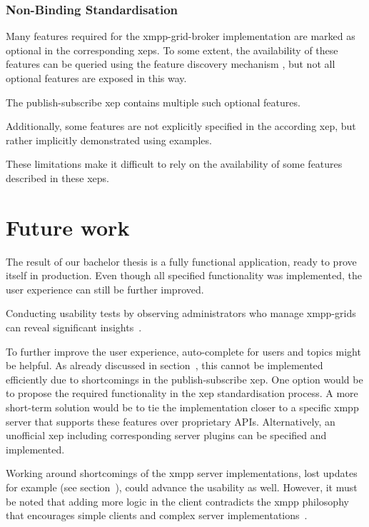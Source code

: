 \subsubsection{Non-Binding Standardisation}

Many features required for the \gls{xmpp-grid-broker} implementation are marked as optional in the corresponding \glspl{xep}.
To some extent, the availability of these features can be queried using the feature discovery mechanism \cite{xep-0030}, but not all optional features are exposed in this way.

The \gls{publish-subscribe} \gls{xep} contains multiple such optional features.

Additionally, some features are not explicitly specified in the according \gls{xep}, but rather implicitly demonstrated using examples.

These limitations make it difficult to rely on the availability of some features described in these \glspl{xep}.


\section{Future work}
The result of our bachelor thesis is a fully functional application, ready to prove itself in production.
Even though all specified functionality was implemented, the user experience can still be further improved.

Conducting usability tests by observing administrators who manage \glspl{xmpp-grid} can reveal significant insights~\cite{krug:dont-make-me-think}.

To further improve the user experience, auto-complete for users and topics might be helpful.
As already discussed in section~, this cannot be implemented efficiently due to shortcomings in the \gls{publish-subscribe} \gls{xep}.
One option would be to propose the required functionality in the \gls{xep} standardisation process.
A more short-term solution would be to tie the implementation closer to a specific \gls{xmpp} server that supports these features over proprietary APIs.
Alternatively, an unofficial \gls{xep} including corresponding server plugins can be specified and implemented.

Working around shortcomings of the \gls{xmpp} server implementations, lost updates for example (see section~), could advance the usability as well.
However, it must be noted that adding more logic in the client contradicts the \gls{xmpp} philosophy that encourages simple clients and complex server implementations~\cite{definitive-guide-xmpp}.

